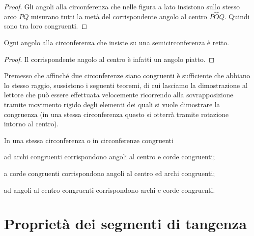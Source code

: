 \noindent\begin{minipage}{0.6\textwidth}\parindent15pt
\begin{proof}
Gli angoli alla circonferenza che nelle figura a lato insistono sullo stesso arco $PQ$ misurano tutti la metà del corrispondente angolo al centro $P\widehat{O}Q$. Quindi sono tra loro congruenti.
\end{proof}
\end{minipage}\hfil
\noindent\begin{minipage}{0.4\textwidth}
	\centering
\end{minipage}

\begin{corollario}
Ogni angolo alla circonferenza che insiste su una semicirconferenza è retto.
\end{corollario}
\noindent\begin{minipage}{0.6\textwidth}\parindent15pt
\begin{proof}
Il corrispondente angolo al centro è infatti un angolo piatto.
\end{proof}
\end{minipage}\hfil
\noindent\begin{minipage}{0.4\textwidth}
	\centering
\end{minipage}

Premesso che affinché due circonferenze siano congruenti è sufficiente che abbiano lo stesso raggio, sussistono i seguenti teoremi, di cui lasciamo la dimostrazione al lettore che può essere effettuata velocemente ricorrendo alla sovrapposizione tramite movimento rigido degli elementi dei quali si vuole dimostrare la congruenza (in una stessa circonferenza questo si otterrà tramite rotazione intorno al centro).

\begin{teorema}
In una stessa circonferenza o in circonferenze congruenti
\begin{itemize*}
\item ad archi congruenti corrispondono angoli al centro e corde congruenti;
\item a corde congruenti corrispondono angoli al centro ed archi congruenti;
\item ad angoli al centro congruenti corrispondono archi e corde congruenti.
\end{itemize*}
\end{teorema}

\section{Proprietà dei segmenti di tangenza}

